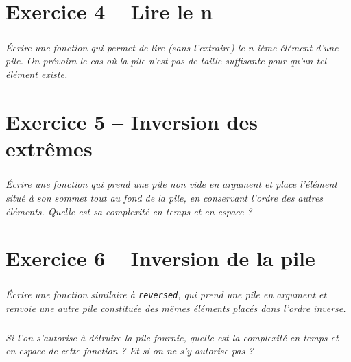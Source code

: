 \documentclass[10pt,fleqn]{article} %
\begin{document}
\begin{multicols}{2}
\section*{Exercice 4 -- Lire  le n\ieme}
\setcounter{exo}{0}
\subparagraph*{}
\textit{Écrire une fonction qui permet de lire (sans l’extraire) le n-ième élément d’une pile. On
prévoira le cas où la pile n’est pas de taille suffisante pour qu’un tel élément existe.}
\ifprof
\begin{corrige}
\end{corrige}
\else
\fi


\section*{Exercice 5 -- Inversion des extrêmes}

\setcounter{exo}{0}
\subparagraph*{}
\textit{Écrire une fonction qui prend une pile non vide en argument et place l’élément situé à
son sommet tout au fond de la pile, en conservant l’ordre des autres éléments.
Quelle est sa complexité en temps et en espace ?}
\ifprof
\begin{corrige}
\end{corrige}
\else
\fi

\section*{Exercice 6 -- Inversion de la pile}
\setcounter{exo}{0}
\subparagraph{}
\textit{Écrire une fonction similaire à \texttt{reversed}, qui prend une pile en argument et renvoie une autre pile constituée des mêmes éléments placés dans l’ordre inverse.}

\subparagraph{}
\textit{ Si l’on s’autorise à détruire la pile fournie, quelle est la complexité en temps et en espace de cette fonction ? Et si on ne s’y autorise pas ?}
\ifprof
\begin{corrige}
\end{corrige}
\else
\fi


\end{multicols}
\end{document}
